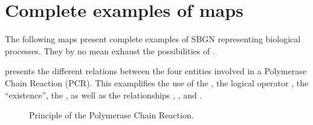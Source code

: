 \chapter{Complete examples of \SBGNERLone maps}

The following maps present complete examples of SBGN \ERs representing biological processes. They by no mean exhaust the possibilities of  \SBGNERLone.

 presents the different relations between the four entities involved in a Polymerase Chain Reaction (PCR). This examplifies the use of the , the logical operator , the  ``existence'', the , as well as the relationships , ,  and .

\begin{figure}[htb]
\begin{center}
\caption{Principle of the Polymerase Chain Reaction.}\label{fig:PCR}
\end{center}
\end{figure}

